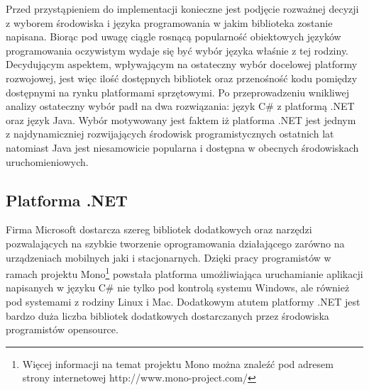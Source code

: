 Przed przystąpieniem do implementacji konieczne jest podjęcie rozważnej decyzji z
wyborem środowiska i języka programowania w jakim biblioteka zostanie napisana.
Biorąc pod uwagę ciągle rosnącą popularność obiektowych języków programowania
oczywistym wydaje się być wybór języka właśnie z tej rodziny. Decydującym
aspektem, wpływającym na ostateczny wybór docelowej platformy rozwojowej, jest
więc ilość dostępnych bibliotek oraz przenośność kodu pomiędzy dostępnymi na
rynku platformami sprzętowymi. Po przeprowadzeniu wnikliwej analizy ostateczny
wybór padł na dwa rozwiązania: język C\# z platformą .NET oraz język Java. 
Wybór motywowany jest faktem iż platforma .NET jest jednym z najdynamiczniej rozwijających środowisk
programistycznych ostatnich lat natomiast Java jest niesamowicie popularna i dostępna w obecnych środowiskach uruchomieniowych. 

\subsection{Platforma .NET}
\label{subsec:sdk-.net}
Firma Microsoft dostarcza szereg bibliotek dodatkowych oraz narzędzi pozwalających na szybkie tworzenie oprogramowania
działającego zarówno na urządzeniach mobilnych jaki i stacjonarnych. Dzięki
pracy programistów w ramach projektu Mono\footnote{Więcej informacji na temat projektu
Mono można znaleźć pod adresem strony internetowej http://www.mono-project.com/}
powstała platforma umożliwiająca uruchamianie aplikacji napisanych w języku C\#
nie tylko pod kontrolą systemu Windows, ale również pod systemami z rodziny Linux
i Mac. Dodatkowym atutem platformy .NET jest bardzo duża liczba bibliotek
dodatkowych dostarczanych przez środowiska programistów opensource.

